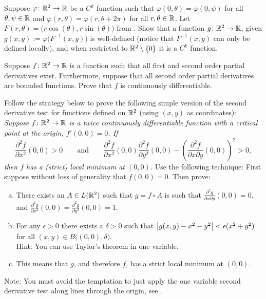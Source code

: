\begin{exercise}
Suppose $\varphi \colon {\mathbb{R}}^2 \to {\mathbb{R}}$ be a $C^k$ function
such that
$\varphi(0,\theta) = \varphi(0,\psi)$ for all $\theta,\psi \in {\mathbb{R}}$
and
$\varphi(r,\theta) = \varphi(r,\theta+2\pi)$ for all $r,\theta \in {\mathbb{R}}$.
Let $F(r,\theta) = \bigl(r \cos(\theta), r \sin(\theta) \bigr)$ from 
.  Show that a function
$g \colon {\mathbb{R}}^2 \to {\mathbb{R}}$, given
$g(x,y) := \varphi \bigl(F^{-1}(x,y)\bigr)$ is well-defined (notice that
$F^{-1}(x,y)$ can only be defined locally), and
when restricted to ${\mathbb{R}}^2 \setminus \{ 0 \}$ it is a $C^k$ function.
\end{exercise}

\begin{exercise}
Suppose $f \colon {\mathbb{R}}^2 \to {\mathbb{R}}$ is a function such that
all first and second order partial derivatives exist.  Furthermore,
suppose that all second order partial derivatives are bounded functions.
Prove that $f$ is continuously differentiable.
\end{exercise}

\begin{exercise}
Follow the strategy below to
prove the following simple version of the second derivative test for
functions defined on ${\mathbb{R}}^2$ (using $(x,y)$ as coordinates):  \emph{Suppose $f \colon {\mathbb{R}}^2
\to {\mathbb{R}}$ is a twice continuously differentiable function with a
critical point at the origin, $f'(0,0) = 0$.  If
\begin{equation*}
\frac{\partial^2 f}{\partial x^2} (0,0) > 0 \qquad \text{and} \qquad
\frac{\partial^2 f}{\partial x^2} (0,0) \frac{\partial^2 f}{\partial y^2}
(0,0) -
{\left(\frac{\partial^2 f}{\partial x \partial y} (0,0) \right)}^2 > 0 ,
\end{equation*}
then $f$ has a (strict) local minimum at $(0,0)$.}
Use the following technique:  First suppose without loss of generality
that $f(0,0) = 0$.  Then prove:
\begin{enumerate}[a)]
\item
There exists an $A \in L({\mathbb{R}}^2)$ such that $g = f \circ A$ is
such that $\frac{\partial^2 g}{\partial x \partial y} (0,0) = 0$, and
$\frac{\partial^2 g}{\partial x^2} (0,0) =
\frac{\partial^2 g}{\partial y^2} (0,0) = 1$.
\item
For any $\epsilon > 0$ there exists a $\delta > 0$
such that 
$\left\lvert {g(x,y) - x^2 - y^2} \right\rvert < \epsilon (x^2+y^2)$ for all
$(x,y) \in B\bigl((0,0),\delta\bigr)$.\\
Hint: You can use Taylor's theorem in one variable.
\item
This means that $g$, and therefore $f$, has a strict local
minimum at $(0,0)$.
\end{enumerate}
Note: You must avoid the temptation to just
apply the one variable second derivative test along lines through the
origin, see .
\end{exercise}
